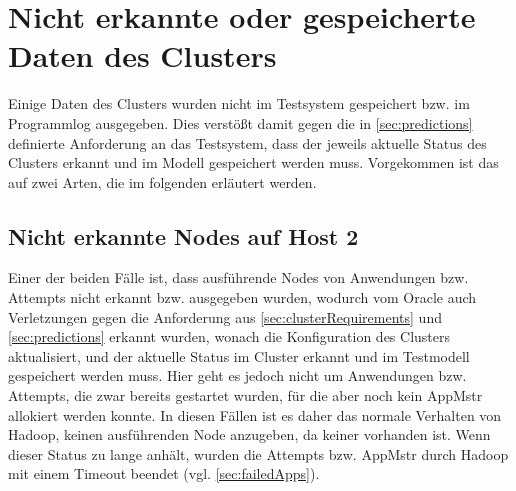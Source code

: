 \section{Nicht erkannte oder gespeicherte Daten des Clusters}
\label{sec:notDetectedData}

Einige Daten des Clusters wurden nicht im Testsystem gespeichert bzw. im Programmlog ausgegeben.
Dies verstößt damit gegen die in \autoref{sec:predictions} definierte Anforderung an das Testsystem, dass der jeweils aktuelle Status des Clusters erkannt und im Modell gespeichert werden muss.
Vorgekommen ist das auf zwei Arten, die im folgenden erläutert werden.

\subsection{Nicht erkannte Nodes auf Host 2}
\label{sec:notDetectedHost2}

Einer der beiden Fälle ist, dass ausführende Nodes von Anwendungen bzw. Attempts nicht erkannt bzw. ausgegeben wurden, wodurch vom Oracle auch Verletzungen gegen die Anforderung aus \autoref{sec:clusterRequirements} und \autoref{sec:predictions} erkannt wurden, wonach die Konfiguration des Clusters aktualisiert, und der aktuelle Status im Cluster erkannt und im Testmodell gespeichert werden muss.
Hier geht es jedoch nicht um Anwendungen bzw. Attempts, die zwar bereits gestartet wurden, für die aber noch kein \ac{AppMstr} allokiert werden konnte.
In diesen Fällen ist es daher das normale Verhalten von Hadoop, keinen ausführenden Node anzugeben, da keiner vorhanden ist.
Wenn dieser Status zu lange anhält, wurden die Attempts bzw. \ac{AppMstr} durch Hadoop mit einem Timeout beendet (vgl. \autoref{sec:failedApps}).

